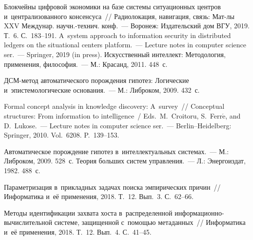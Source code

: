 \begin{multicols}{2}
  {\small\frenchspacing
 {%
 \begin{thebibliography}{9}
 Блокчейны цифровой экономики на базе 
системы ситуационных центров и~централизованного консенсуса~// Радиолокация, навигация, 
связь: Мат-лы XXV Междунар. научн.-технич. конф.~---
Воронеж: Издательский дом ВГУ, 2019. Т.~6. С.~183--191. 
 A~system approach to information security in 
distributed ledgers on the situational centers platform.~---
Lecture notes in computer science ser.~--- Springer, 2019 
(in press).
 Искусственный интеллект: Методология, применения, философия.~--- М.: 
Красанд, 2011. 448~с.

 ДСМ-ме\-тод автоматического порождения 
гипотез: Логические и~эпистемологические основания.~--- М.: Либроком, 2009. 432~с.

 Formal concept analysis in knowledge 
discovery: A~survey~// Conceptual structures: From information to intelligence~/ Eds.\ M.~Croitoru, 
S.~Ferr$\acute{\mbox{e}}$, and D.~Lukose.~--- Lecture notes in computer science 
ser.~--- Berlin--Heidelberg: Springer, 2010. Vol.~6208.  P.~139--153.

 Автоматическое по\-рож\-де\-ние гипотез в~интеллектуальных 
системах.~--- М.: Либроком, 2009. 528~с. 
 Теория больших систем управления.~--- Л.: Энергоиздат, 1982. 488~с.

Параметризация в~прикладных задачах поиска эмпирических причин~// Информатика и~её 
применения, 2018. Т.~12. Вып.~3. С.~62--66.

 Методы идентификации 
захвата хоста в~распределенной ин\-фор\-ма\-ци\-он\-но-вы\-чис\-ли\-тель\-ной сис\-те\-ме, 
защищенной с~помощью метаданных~// Информатика и~её применения, 2018. Т.~12. Вып.~4. 
С.~41--45.

 \end{thebibliography}

 }
 }

\end{multicols}

